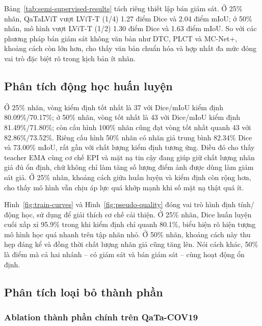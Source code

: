 Bảng~\ref{tab:semi-supervised-results} tách riêng thiết lập bán giám sát. Ở 25\% nhãn, QaTaLViT vượt LViT-T (1/4) 1.27 điểm Dice và 2.04 điểm mIoU; ở 50\% nhãn, mô hình vượt LViT-T (1/2) 1.30 điểm Dice và 1.63 điểm mIoU. So với các phương pháp bán giám sát không văn bản như DTC, PLCT và MC-Net+, khoảng cách còn lớn hơn, cho thấy văn bản chuẩn hóa và hợp nhất đa mức đóng vai trò đặc biệt rõ trong kịch bản ít nhãn.

\subsection{Phân tích động học huấn luyện}

Ở 25\% nhãn, vòng kiểm định tốt nhất là 37 với Dice/mIoU kiểm định 80.09\%/70.17\%; ở 50\% nhãn, vòng tốt nhất là 43 với Dice/mIoU kiểm định 81.49\%/71.80\%; còn cấu hình 100\% nhãn cũng đạt vòng tốt nhất quanh 43 với 82.86\%/73.52\%. Riêng cấu hình 50\% nhãn có nhãn giả trung bình 82.34\% Dice và 73.00\% mIoU, rất gần với chất lượng kiểm định tương ứng. Điều đó cho thấy teacher EMA cùng cơ chế EPI và mặt nạ tin cậy đang giúp giữ chất lượng nhãn giả đủ ổn định, chứ không chỉ làm tăng số lượng điểm ảnh được dùng làm giám sát giả. Ở 25\% nhãn, khoảng cách giữa huấn luyện và kiểm định còn rộng hơn, cho thấy mô hình vẫn chịu áp lực quá khớp mạnh khi số mặt nạ thật quá ít.

Hình~\ref{fig:train-curves} và Hình~\ref{fig:pseudo-quality} đóng vai trò hình định tính/động học, sử dụng để giải thích cơ chế cải thiện. Ở 25\% nhãn, Dice huấn luyện cuối xấp xỉ 95.9\% trong khi kiểm định chỉ quanh 80.1\%, biểu hiện rõ hiện tượng mô hình học quá nhanh trên tập nhãn nhỏ. Ở 50\% nhãn, khoảng cách này thu hẹp đáng kể và đồng thời chất lượng nhãn giả cũng tăng lên. Nói cách khác, 50\% là điểm mà cả hai nhánh -- có giám sát và bán giám sát -- cùng hoạt động ổn định.

\subsection{Phân tích loại bỏ thành phần}

\label{sec:ablation}

\subsubsection{Ablation thành phần chính trên QaTa-COV19}


